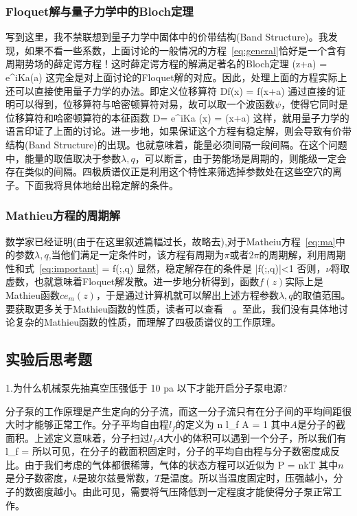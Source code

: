 \documentclass{ctexart}
\begin{document}
\subsubsection{Floquet解与量子力学中的Bloch定理}
\par 写到这里，我不禁联想到量子力学中固体中的价带结构(Band Structure)。我发现，如果不看一些系数，上面讨论的一般情况的方程~\ref{eq:general}恰好是一个含有周期势场的薛定谔方程！这时薛定谔方程的解满足著名的Bloch定理
\beq
\psi(z+a) = e^{iKa}\psi(a)
\eeq
这完全是对上面讨论的Floquet解的对应。因此，处理上面的方程实际上还可以直接使用量子力学的办法。即定义位移算符
\beq
Df(x) = f(x+a)
\eeq
通过直接的证明可以得到，位移算符与哈密顿算符对易，故可以取一个波函数$\psi$，使得它同时是位移算符和哈密顿算符的本征函数
\beq
D\psi = e^{iKa} \psi(x) = \psi(x+a)
\eeq
这样，就用量子力学的语言印证了上面的讨论。进一步地，如果保证这个方程有稳定解，则会导致有价带结构(Band Structure)的出现。也就意味着，能量必须间隔一段间隔。在这个问题中，能量的取值取决于参数$\lambda,q$，可以断言，由于势能场是周期的，则能级一定会存在类似的间隔。四极质谱仪正是利用这个特性来筛选掉参数处在这些空穴的离子。下面我将具体地给出稳定解的条件。

\subsubsection{Mathieu方程的周期解}
\par 数学家已经证明(由于在这里叙述篇幅过长，故略去),对于Matheiu方程~\ref{eq:ma}中的参数$\lambda,q$,当他们满足一定条件时，该方程有周期为$\pi$或者$2\pi$的周期解，利用周期性和式~\ref{eq:important}
\beq
\cos\nu \pi = f(\pi;\lambda,q)
\eeq
显然，稳定解存在的条件是
\beq\label{eq:condition}
|f(\pi;\lambda,q)|<1
\eeq
否则，$\nu$将取虚数，也就意味着Floquet解发散。进一步地分析得到，函数$f(z)$实际上是Mathieu函数$ce_m(z)$，于是通过计算机就可以解出上述方程参数$\lambda,q$的取值范围。要获取更多关于Mathieu函数的性质，读者可以查看~\cite{ma_func}~\cite{special_func}。至此，我们没有具体地讨论复杂的Mathieu函数的性质，而理解了四极质谱仪的工作原理。




\subsection{实验后思考题}
1.为什么机械泵先抽真空压强低于 10 pa 以下才能开启分子泵电源?

分子泵的工作原理是产生定向的分子流，而这一分子流只有在分子间的平均间距很大时才能够正常工作。分子平均自由程$l_f$的定义为
\beq
n l_f A = 1
\eeq
其中$A$是分子的截面积。上述定义意味着，分子扫过$l_f A$大小的体积可以遇到一个分子，所以我们有
\beq
l_f = 
\eeq
所以可见，在分子的截面积固定时，分子的平均自由程与分子数密度成反比。由于我们考虑的气体都很稀薄，气体的状态方程可以近似为
\beq
P = nkT
\eeq
其中$n$是分子数密度，$k$是玻尔兹曼常数，$T$是温度。所以当温度固定时，压强越小，分子的数密度越小。由此可见，需要将气压降低到一定程度才能使得分子泵正常工作。
\end{document}

